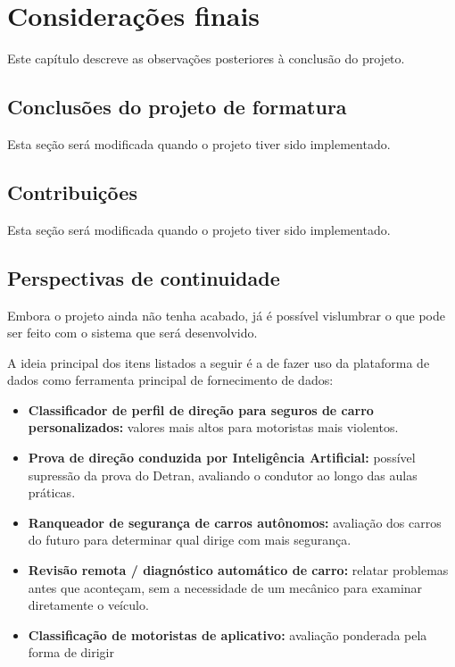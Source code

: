 \chapter{Considerações finais}

Este capítulo descreve as observações posteriores à conclusão do projeto.

\section{Conclusões do projeto de formatura}
Esta seção será modificada quando o projeto tiver sido implementado.

\section{Contribuições}
Esta seção será modificada quando o projeto tiver sido implementado.

\section{Perspectivas de continuidade}
Embora o projeto ainda não tenha acabado, já é possível vislumbrar o que pode ser feito com o sistema que será desenvolvido.

A ideia principal dos itens listados a seguir é a de fazer uso da plataforma de dados como ferramenta principal de fornecimento de dados:

\begin{itemize}
    \item \textbf{Classificador de perfil de direção para seguros de carro personalizados:} valores mais altos para motoristas mais violentos.
    
    \item \textbf{Prova de direção conduzida por Inteligência Artificial:} possível supressão da prova do Detran, avaliando o condutor ao longo das aulas práticas.
    
    \item \textbf{Ranqueador de segurança de carros autônomos:} avaliação dos carros do futuro para determinar qual dirige com mais segurança.
    
    \item \textbf{Revisão remota / diagnóstico automático de carro:} relatar problemas antes que aconteçam, sem a necessidade de um mecânico para examinar diretamente o veículo.
    
    \item \textbf{Classificação de motoristas de aplicativo:} avaliação ponderada pela forma de dirigir
\end{itemize}